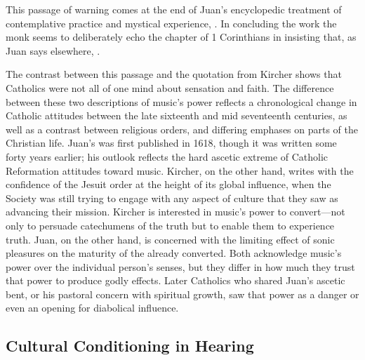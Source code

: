 This passage of warning comes at the end of Juan's encyclopedic treatment of
contemplative practice and mystical experience, .
In concluding the work the monk seems to deliberately echo the 
chapter of 1 Corinthians in insisting that, as Juan says elsewhere, .%
    \Autocite
    [, , : .]
    {JuandelaCruz:Subida}

The contrast between this passage and the quotation from Kircher shows that
Catholics were not all of one mind about sensation and faith.
The difference between these two descriptions of music's power reflects  a
chronological change in Catholic attitudes between the late sixteenth and mid
seventeenth centuries, as well as a contrast between religious orders, and
differing emphases on parts of the Christian life.
Juan's  was first published in 1618, though it
was written some forty years earlier; his outlook reflects the hard ascetic
extreme of Catholic Reformation attitudes toward music.
Kircher, on the other hand, writes with the confidence of the Jesuit order at
the height of its global influence, when the Society was still trying to engage
with any aspect of culture that they saw as advancing their mission.
Kircher is interested in music's power to convert---not only to persuade
catechumens of the truth but to enable them to experience truth.
Juan, on the other hand, is concerned with the limiting effect of sonic
pleasures on the maturity of the already converted.
Both acknowledge music's power over the individual person's senses, but they
differ in how much they trust that power to produce godly effects.
Later Catholics who shared Juan's ascetic bent, or his pastoral concern with
spiritual growth, saw that power as a danger or even an opening for diabolical
influence.


\subsection{Cultural Conditioning in Hearing}


